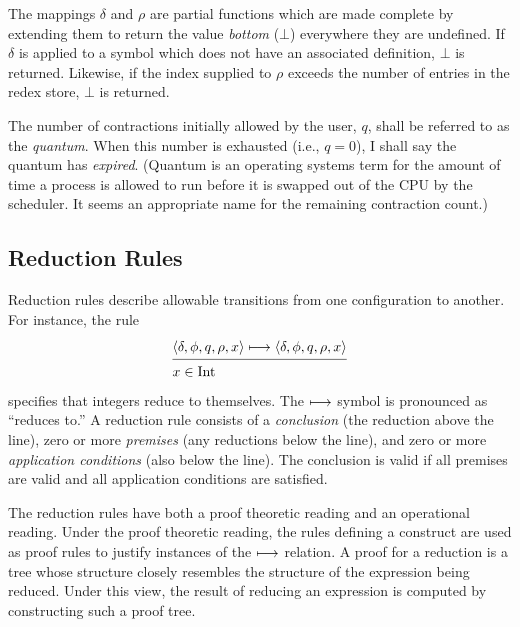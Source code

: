 The mappings \(\delta\) and \(\rho\) are partial functions which are made
complete by extending them to return the value \emph{bottom} (\(\bot\)) everywhere they
are undefined. If \(\delta\) is applied to a symbol which does not have an
associated definition, \(\bot\) is returned. Likewise, if the index supplied to
\(\rho\) exceeds the number of entries in the redex store, \(\bot\) is returned.

The number of contractions initially allowed by the user, \(q\), shall be
referred to as the \emph{quantum}. When this number is exhausted (i.e., \(q=0\)), I
shall say the quantum has \emph{expired}. (Quantum is an operating systems term
for the amount of time a process is allowed to run before it is swapped out of
the CPU by the scheduler. It seems an appropriate name for the remaining
contraction count.)

\subsection{Reduction Rules}

Reduction rules describe allowable transitions from one configuration to
another. For instance, the rule
\[
\semanticrule{\cfg{\delta}{\phi}{q}{\rho}{x}\redsto
      \cfg{\delta}{\phi}{q}{\rho}{x}}
     {x\in \Int}
\]
specifies that integers reduce to themselves. The \(\longmapsto\) symbol is
pronounced as ``reduces to.'' A reduction rule consists of a \emph{conclusion} (the
reduction above the line), zero or more \emph{premises} (any reductions below the
line), and zero or more \emph{application conditions} (also below the line). The
conclusion is valid if all premises are valid and all application conditions are
satisfied.

The reduction rules have both a proof theoretic reading and an operational
reading. Under the proof theoretic reading, the rules defining a construct are
used as proof rules to justify instances of the \(\longmapsto\) relation. A proof
for a reduction is a tree whose structure closely resembles the structure of the
expression being reduced. Under this view, the result of reducing an expression
is computed by constructing such a proof tree.

